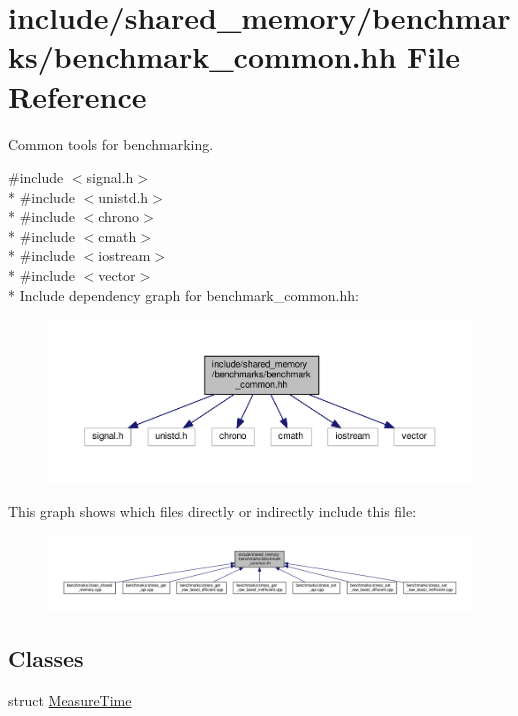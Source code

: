 \hypertarget{benchmark__common_8hh}{}\section{include/shared\+\_\+memory/benchmarks/benchmark\+\_\+common.hh File Reference}
\label{benchmark__common_8hh}


Common tools for benchmarking.  


{\ttfamily \#include $<$signal.\+h$>$}\\*
{\ttfamily \#include $<$unistd.\+h$>$}\\*
{\ttfamily \#include $<$chrono$>$}\\*
{\ttfamily \#include $<$cmath$>$}\\*
{\ttfamily \#include $<$iostream$>$}\\*
{\ttfamily \#include $<$vector$>$}\\*
Include dependency graph for benchmark\+\_\+common.\+hh\+:
\nopagebreak
\begin{figure}[H]
\begin{center}
\leavevmode
\includegraphics[width=350pt]{benchmark__common_8hh__incl}
\end{center}
\end{figure}
This graph shows which files directly or indirectly include this file\+:
\nopagebreak
\begin{figure}[H]
\begin{center}
\leavevmode
\includegraphics[width=350pt]{benchmark__common_8hh__dep__incl}
\end{center}
\end{figure}
\subsection*{Classes}
\begin{DoxyCompactItemize}
\item 
struct \hyperlink{structMeasureTime}{Measure\+Time}
\end{DoxyCompactItemize}
